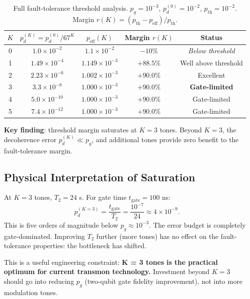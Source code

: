 \documentclass[11pt]{article}
\theoremstyle{definition}
\theoremstyle{remark}
\begin{document}
\begin{table}[h]
\centering
\caption{Full fault-tolerance threshold analysis.
$p_g = 10^{-3}$, $p_d^{(0)} = 10^{-2}$, $p_{\mathrm{th}} = 10^{-2}$.
Margin $r(K) = (p_{\mathrm{th}} - p_{\mathrm{eff}})/p_{\mathrm{th}}$.}
\label{tab:threshold}
\begin{tabular}{@{}ccccc@{}}
\toprule
$K$ & $p_d^{(K)} = p_d^{(0)}/67^K$ & $p_{\mathrm{eff}}(K)$ & Margin $r(K)$ & Status \\
\midrule
0 & $1.0\times10^{-2}$ & $1.1\times10^{-2}$ & $-10\%$ & \textit{Below threshold} \\
1 & $1.49\times10^{-4}$ & $1.149\times10^{-3}$ & $+88.5\%$ & Well above threshold \\
2 & $2.23\times10^{-6}$ & $1.002\times10^{-3}$ & $+90.0\%$ & Excellent \\
3 & $3.3\times10^{-8}$ & $1.000\times10^{-3}$ & $+90.0\%$ & \textbf{Gate-limited} \\
4 & $5.0\times10^{-10}$ & $1.000\times10^{-3}$ & $+90.0\%$ & Gate-limited \\
5 & $7.4\times10^{-12}$ & $1.000\times10^{-3}$ & $+90.0\%$ & Gate-limited \\
\bottomrule
\end{tabular}
\end{table}

\textbf{Key finding}: threshold margin saturates at $K = 3$ tones.  Beyond
$K = 3$, the decoherence error $p_d^{(K)} \ll p_g$, and additional tones
provide zero benefit to the fault-tolerance margin.

\subsection{Physical Interpretation of Saturation}

At $K = 3$ tones, $T_2 = 24$ s.  For gate time $t_{\mathrm{gate}} = 100$ ns:
\begin{equation}
  p_d^{(K=3)} = \frac{t_{\mathrm{gate}}}{T_2} = \frac{10^{-7}}{24} \approx 4\times10^{-9}.
\end{equation}
This is five orders of magnitude below $p_g \approx 10^{-3}$.  The error budget
is completely gate-dominated.  Improving $T_2$ further (more tones) has no
effect on the fault-tolerance properties: the bottleneck has shifted.

This is a useful engineering constraint: \textbf{K = 3 tones is the practical
optimum for current transmon technology.}  Investment beyond $K = 3$ should
go into reducing $p_g$ (two-qubit gate fidelity improvement), not into more
modulation tones.
\end{document}
